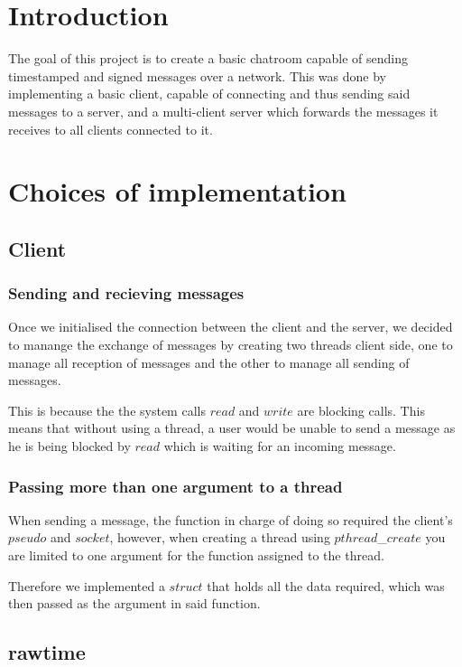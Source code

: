 \documentclass[utf8]{article}
\begin{document}
\tableofcontents
\newpage

\section{Introduction}

The goal of this project is to create a basic chatroom capable of sending timestamped and signed messages over a network. This was done by implementing a basic client, capable of connecting and thus sending said messages to a server, and  a multi-client server which forwards the messages it receives to all clients connected to it.

\section{Choices of implementation}

\subsection{Client}

\subsubsection{Sending and recieving messages}
Once we initialised the connection between the client and the server, we decided to manange the exchange of messages by creating two threads client side, one to manage all reception of messages and the other to manage all sending of messages. \par
This is because the the system calls $read$ and $write$ are blocking calls. This means that without using a thread, a user would be unable to send a message as he is being blocked by $read$ which is waiting for an incoming message.

\subsubsection{Passing more than one argument to a thread}
When sending a message, the function in charge of doing so required the client's $pseudo$ and $socket$, however, when creating a thread using $pthread$\_$create$ you are limited to one argument for the function assigned to the thread.\par
Therefore we implemented a $struct$ that holds all the data required, which was then passed as the argument in said function.

\subsection{rawtime}
\end{document}
